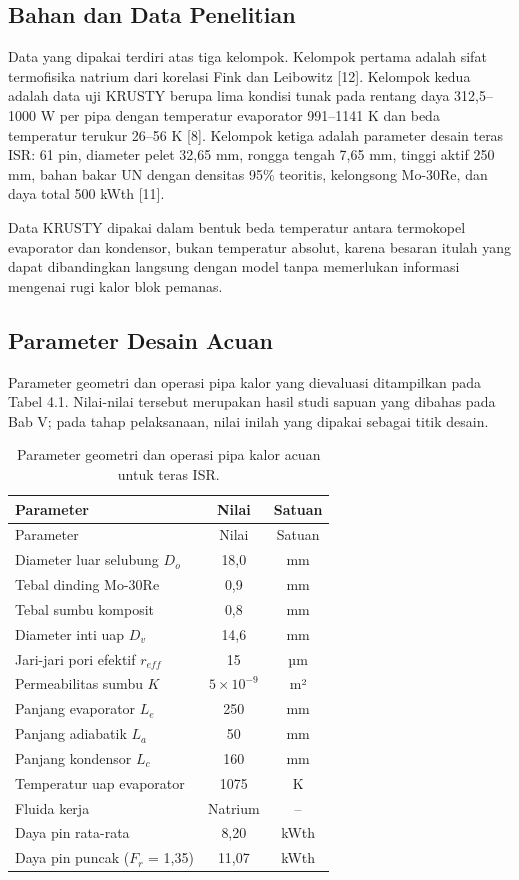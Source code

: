 \documentclass[
  indonesian,
  12pt,
  a4paper,
]{report}
\begin{document}
\subsection{Bahan dan Data Penelitian}\label{bahan-dan-data-penelitian}

Data yang dipakai terdiri atas tiga kelompok. Kelompok pertama adalah
sifat termofisika natrium dari korelasi Fink dan Leibowitz {[}12{]}.
Kelompok kedua adalah data uji KRUSTY berupa lima kondisi tunak pada
rentang daya 312,5--1000 W per pipa dengan temperatur evaporator
991--1141 K dan beda temperatur terukur 26--56 K {[}8{]}. Kelompok
ketiga adalah parameter desain teras ISR: 61 pin, diameter pelet 32,65
mm, rongga tengah 7,65 mm, tinggi aktif 250 mm, bahan bakar UN dengan
densitas 95\% teoritis, kelongsong Mo-30Re, dan daya total 500 kWth
{[}11{]}.

Data KRUSTY dipakai dalam bentuk beda temperatur antara termokopel
evaporator dan kondensor, bukan temperatur absolut, karena besaran
itulah yang dapat dibandingkan langsung dengan model tanpa memerlukan
informasi mengenai rugi kalor blok pemanas.

\subsection{Parameter Desain Acuan}\label{parameter-desain-acuan}

Parameter geometri dan operasi pipa kalor yang dievaluasi ditampilkan
pada Tabel 4.1. Nilai-nilai tersebut merupakan hasil studi sapuan yang
dibahas pada Bab V; pada tahap pelaksanaan, nilai inilah yang dipakai
sebagai titik desain.

\begin{longtable}[]{@{}lcc@{}}
\caption{Parameter geometri dan operasi pipa kalor acuan untuk teras
ISR.}\label{tbl-parameter}\tabularnewline
\toprule\noalign{}
Parameter & Nilai & Satuan \\
\midrule\noalign{}
\endfirsthead
\toprule\noalign{}
Parameter & Nilai & Satuan \\
\midrule\noalign{}
\endhead
\bottomrule\noalign{}
\endlastfoot
Diameter luar selubung \(D_o\) & 18,0 & mm \\
Tebal dinding Mo-30Re & 0,9 & mm \\
Tebal sumbu komposit & 0,8 & mm \\
Diameter inti uap \(D_v\) & 14,6 & mm \\
Jari-jari pori efektif \(r_{eff}\) & 15 & µm \\
Permeabilitas sumbu \(K\) & \(5\times10^{-9}\) & m² \\
Panjang evaporator \(L_e\) & 250 & mm \\
Panjang adiabatik \(L_a\) & 50 & mm \\
Panjang kondensor \(L_c\) & 160 & mm \\
Temperatur uap evaporator & 1075 & K \\
Fluida kerja & Natrium & -- \\
Daya pin rata-rata & 8,20 & kWth \\
Daya pin puncak (\(F_r\) = 1,35) & 11,07 & kWth \\
\end{longtable}
\end{document}
